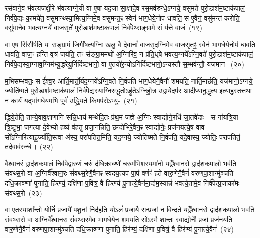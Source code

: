 रस॑वाने॒व भ॑वत्यजक्षी॒रे भ॑वत्याग्ने॒यी वा ए॒षा यद॒जा सा॒क्षादे॒व रस॒मव॑\-रुन्धे॒\-ऽग्नये॒ वसु॑मते पुरो॒डाश॑\-म॒ष्टा\-क॑पालं॒ निर्व॑पे॒द्यः का॒मये॑त॒ वसु॑मान्थ्स्या॒मित्य॒ग्निमे॒व वसु॑मन्त॒ꣴ॒ स्वेन॑ भाग॒धेये॒नोप॑ धावति॒ स ए॒वैनं॒ वसु॑मन्तं करोति॒ वसु॑माने॒व भ॑वत्य॒ग्नये॑ वाज॒सृते॑ पुरो॒डाश॑\-म॒ष्टा\-क॑पालं॒ निर्व॑पेथ्सङ्ग्रा॒मे सं य॑त्ते॒ वाजं॒~(१९)

वा ए॒ष सि॑सीर्\mbox{}षति॒ यः स॑ङ्ग्रा॒मं जिगी॑षत्य॒ग्निः खलु॒ वै दे॒वानां᳚ वाज॒सृद॒ग्निमे॒व वा॑ज॒सृत॒ꣴ॒ स्वेन॑ भाग॒धेये॒नोप॑ धावति॒ धाव॑ति॒ वाज॒ꣳ॒ हन्ति॑ वृ॒त्रं जय॑ति॒ तꣳ स॑ङ्ग्रा॒ममथो॑ अ॒ग्निरि॑व॒ न प्र॑ति॒धृषे॑ भवत्य॒ग्नये᳚\-ऽग्नि॒वते॑ पुरो॒डाश॑\-म॒ष्टा\-क॑पालं॒ निर्व॑पे॒द्यस्या॒ग्नाव॒ग्निम॑भ्यु॒द्धरे॑यु॒र्निर्दि॑ष्टभागो॒ वा ए॒तयो॑र॒न्यो\-ऽनि॑र्दिष्टभागो॒\-ऽन्यस्तौ स॒म्भव॑न्तौ॒ यज॑मान-~(२०)

म॒भिसम्भ॑वतः॒ स ई᳚श्व॒र आर्ति॒मार्तो॒र्यद॒ग्नये᳚\-ऽग्नि॒वते॑ नि॒र्वप॑ति भाग॒धेये॑नै॒वैनौ॑ शमयति॒ नार्ति॒मार्छ॑ति॒ यज॑मानो॒\-ऽग्नये॒ ज्योति॑ष्मते पुरो॒डाश॑\-म॒ष्टा\-क॑पालं॒ निर्व॑पे॒द्यस्या॒ग्निरुद्धृ॒तो\-ऽहु॑ते\-ऽग्निहो॒त्र उ॒द्वाये॒दप॑र आ॒दीप्या॑नू॒द्धृत्य॒ इत्या॑हु॒स्तत्तथा॒ न का॒र्यं॑ यद्भा॑ग॒धेय॑म॒भि पूर्व॑ उद्ध्रि॒यते॒ किमप॑रो॒\-ऽभ्यु-~(२१)

द्ध्रि॑ये॒तेति॒ तान्ये॒वाव॒क्षाणा॑नि सन्नि॒धाय॑ मन्थेदि॒तः प्र॑थ॒मं ज॑ज्ञे अ॒ग्निः स्वाद्योने॒रधि॑ जा॒तवे॑दाः। स गा॑यत्रि॒या त्रि॒ष्टुभा॒ जग॑त्या दे॒वेभ्यो॑ ह॒व्यं व॑हतु प्रजा॒नन्निति॒ छन्दो॑भिरे॒वैन॒ꣴ॒ स्वाद्योनेः॒ प्रज॑नयत्ये॒ष वाव सो᳚\-ऽग्निरित्या॑हु॒र्ज्योति॒स्त्वा अ॑स्य॒ परा॑पतित॒मिति॒ यद॒ग्नये॒ ज्योति॑ष्मते नि॒र्वप॑ति॒ यदे॒वास्य॒ ज्योतिः॒ परा॑पतितं॒ तदे॒\-वाव॑\-रुन्धे॥~(२२)

{\anuvakamend[{क॒रो॒त्य॒न्ना॒दो द॑धाति॒ यद॒ग्नये॒ शुच॑ये॒ चक्षु॑रे॒वास्मि॒न्तेन॑ दधाति करोति॒ वाजं॒ यज॑मान॒मुदे॒वास्य॒ षट्च॑}]}%

वै॒श्वा॒न॒रं द्वाद॑श\-कपालं॒ निर्व॑पेद्वारु॒णं च॒रुं द॑धि॒क्राव्ण्णे॑ च॒रुम॑भिश॒स्यमा॑नो॒ यद्वै᳚श्वान॒रो द्वाद॑श\-कपालो॒ भव॑ति संवथ्स॒रो वा अ॒ग्निर्वै᳚श्वान॒रः सं॑वथ्स॒रेणै॒वैनꣴ॑ स्वदय॒त्यप॑ पा॒पं वर्णꣳ॑ हते वारु॒णेनै॒वैनं॑ वरुणपा॒शान्मु॑ञ्चति दधि॒क्राव्ण्णा॑ पुनाति॒ हिर॑ण्यं॒ दक्षि॑णा प॒वित्रं॒ वै हिर॑ण्यं पु॒नात्ये॒वैन॑मा॒द्य॑म॒स्यान्नं॑ भवत्ये॒तामे॒व निर्व॑पेत्प्र॒जाका॑मः संवथ्स॒रो~(२३)

वा ए॒तस्याशा᳚न्तो॒ योनिं॑ प्र॒जायै॑ पशू॒नां निर्द॑हति॒ यो\-ऽलं॑ प्र॒जायै॒ सन्प्र॒जां न वि॒न्दते॒ यद्वै᳚श्वान॒रो द्वाद॑श\-कपालो॒ भव॑ति संवथ्स॒रो वा अ॒ग्निर्वै᳚श्वान॒रः सं॑वथ्स॒रमे॒व भा॑ग॒धेये॑न शमयति॒ सो᳚\-ऽस्मै शा॒न्तः स्वाद्योनेः᳚ प्र॒जां प्रज॑नयति वारु॒णेनै॒वैनं॑ वरुणपा॒शान्मु॑ञ्चति दधि॒क्राव्ण्णा॑ पुनाति॒ हिर॑ण्यं॒ दक्षि॑णा प॒वित्रं॒ वै हिर॑ण्यं पु॒नात्ये॒वैनं॑~(२४)

